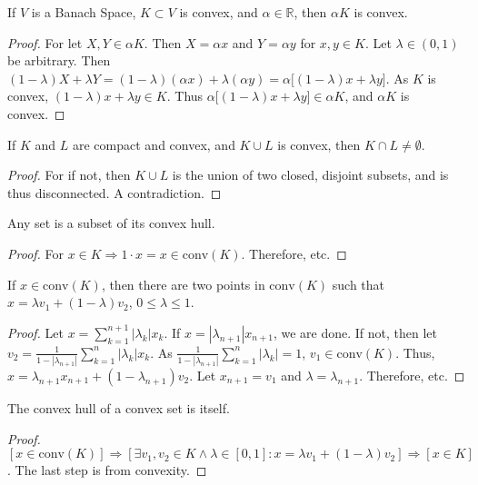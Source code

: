 \documentclass[crop=false,class=book]{standalone}
\begin{document}
\begin{theorem}
If $V$ is a Banach Space, $K\subset V$ is convex, and $\alpha \in \mathbb{R}$, then $\alpha K$ is convex.
\end{theorem}
\begin{proof}
For let $X,Y\in \alpha K$. Then $X = \alpha x$ and $Y = \alpha y$ for $x,y\in K$. Let $\lambda \in (0,1)$ be arbitrary. Then $(1-\lambda)X+\lambda Y =(1-\lambda)(\alpha x)+\lambda (\alpha y) = \alpha\big[(1-\lambda)x+\lambda y\big]$. As $K$ is convex, $(1-\lambda)x+\lambda y \in K$. Thus $\alpha\big[(1-\lambda)x+\lambda y\big] \in \alpha K$, and $\alpha K$ is convex.
\end{proof}
\begin{theorem}
If $K$ and $L$ are compact and convex, and $K\cup L$ is convex, then $K\cap L \ne \emptyset$.
\end{theorem}
\begin{proof}
For if not, then $K\cup L$ is the union of two closed, disjoint subsets, and is thus disconnected. A contradiction. 
\end{proof}
\begin{lemma}
Any set is a subset of its convex hull.
\end{lemma}
\begin{proof}
For $x\in K \Rightarrow 1\cdot x=x \in \textrm{conv}(K)$. Therefore, etc.
\end{proof}
\begin{lemma}
If $x\in \textrm{conv}(K)$, then there are two points in $\textrm{conv}(K)$ such that $x = \lambda v_1 +(1- \lambda) v_2$, $0 \leq \lambda \leq 1$.
\end{lemma}
\begin{proof}
Let $x=\sum_{k=1}^{n+1}|\lambda_k| x_k$. If $x=|\lambda_{n+1}|x_{n+1}$, we are done. If not, then let $v_2 = \frac{1}{1-|\lambda_{n+1}|}\sum_{k=1}^{n}|\lambda_k|x_k$. As $\frac{1}{1-|\lambda_{n+1}|}\sum_{k=1}^{n}|\lambda_k| = 1$, $v_1\in \textrm{conv}(K)$. Thus, $x = \lambda_{n+1}x_{n+1}+(1-\lambda_{n+1})v_2$. Let $x_{n+1}=v_1$ and $\lambda = \lambda_{n+1}$. Therefore, etc.
\end{proof}
\begin{theorem}
The convex hull of a convex set is itself.
\end{theorem}
\begin{proof}
$[x\in \textrm{conv}(K)]\Rightarrow [\exists v_1,v_2\in K\land \lambda\in[0,1]:x=\lambda v_1+(1-\lambda)v_2]\Rightarrow [x\in K]$. The last step is from convexity.
\end{proof}
\end{document}
